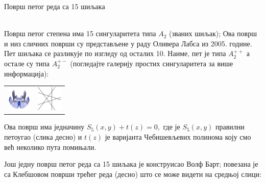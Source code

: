 ﻿\documentclass[en]{./../../common/SurferDesc}%
\begin{document}
\footnotesize




\begin{surferPage}
  \begin{surferTitle}Површ петог реда са 15 шиљака\end{surferTitle}   \\
  Површ петог степена има 15 сингуларитета типа $A_2$
    (званих шиљак); Ова површ и низ сличних површи су представљене у  раду Оливера 
	Лабса из 2005. године.
    Пет шиљака се разликује по изгледу од осталих 10.
    Наиме, пет је типа $A_2^{++}$ а остале су типа $A_2^{+-}$ (погледајте галерију 
	простих сингуларитета за више информација):

     \vspace*{-0.3em}
    \begin{center}
      \begin{tabular}{c@{\qquad}c}
        \includegraphics[height=1.2cm]{./../../common/images/dessins_quint_15a2}
        &
        \includegraphics[height=1.2cm]{./../../common/images/rp5.pdf}
      \end{tabular}
    \end{center}
    \vspace*{-0.3em}    
    
    Ова површ има једначину  
    $S_5(x,y) + t(z)=0,$
    где је $S_5(x,y)$ правилни петоугао (слика десно) и $t(z)$ је варијанта 
	Чебишевљевих полинома коју смо већ неколико пута помињали.

     Још једну површ петог реда са 15 шиљака је конструисао Волф Барт; 
	 повезана је са Клебшовом површи трећег реда (десно) што се може видети на средњој слици:


\end{surferPage}
\end{document}
